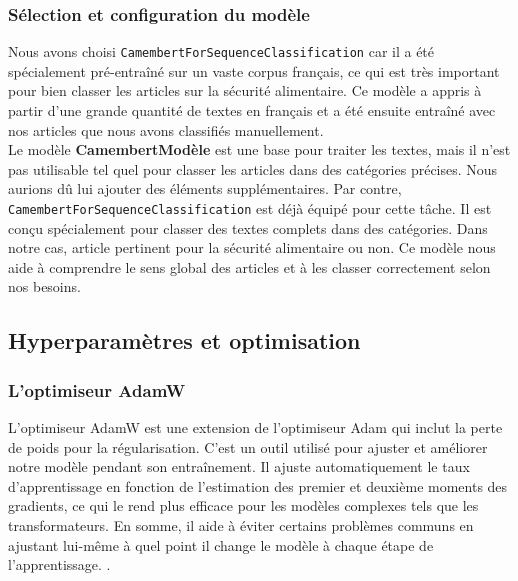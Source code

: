 \documentclass{article}
\begin{document}
\subsubsection{Sélection et configuration du modèle}
Nous avons choisi \texttt{CamembertForSequenceClassification} car il a été spécialement pré-entraîné sur un vaste corpus français, ce qui est très important pour bien classer les articles sur la sécurité alimentaire. Ce modèle a appris à partir d'une grande quantité de textes en français et a été ensuite entraîné avec nos articles que nous avons classifiés manuellement. \\

Le modèle \textbf{CamembertModèle} est une base pour traiter les textes, mais il n'est pas utilisable tel quel pour classer les articles dans des catégories précises. Nous aurions dû lui ajouter des éléments supplémentaires. Par contre, \texttt{CamembertForSequenceClassification} est déjà équipé pour cette tâche. Il est conçu spécialement pour classer des textes complets dans des catégories. Dans notre cas, article pertinent pour la sécurité alimentaire ou non. Ce modèle nous aide à comprendre le sens global des articles et à les classer correctement selon nos besoins.

\subsection{Hyperparamètres et optimisation}
\subsubsection{L'optimiseur AdamW}
L'optimiseur AdamW est une extension de l'optimiseur Adam qui inclut la perte de poids pour la régularisation. C'est un outil utilisé pour ajuster et améliorer notre modèle pendant son entraînement. Il ajuste automatiquement le taux d'apprentissage en fonction de l'estimation des premier et deuxième moments des gradients, ce qui le rend plus efficace pour les modèles complexes tels que les transformateurs. En somme, il aide à éviter certains problèmes communs en ajustant lui-même à quel point il change le modèle à chaque étape de l'apprentissage. \cite{adamw}.
\end{document}

